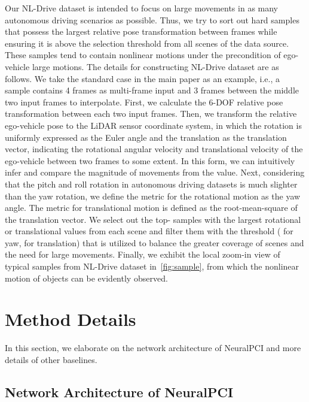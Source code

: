 \documentclass[10pt,twocolumn,letterpaper]{article}
\begin{document}
Our NL-Drive dataset is intended to focus on large movements in as many autonomous driving scenarios as possible. Thus, we try to sort out hard samples that possess the largest relative pose transformation between frames while ensuring it is above the selection threshold from all scenes of the data source. These samples tend to contain nonlinear motions under the precondition of ego-vehicle large motions. The details for constructing NL-Drive dataset are as follows. We take the standard case in the main paper as an example, i.e., a sample contains 4 frames as multi-frame input and 3 frames between the middle two input frames to interpolate. First, we calculate the 6-DOF relative pose transformation between each two input frames. Then, we transform the relative ego-vehicle pose to the LiDAR sensor coordinate system, in which the rotation is uniformly expressed as the Euler angle and the translation as the translation vector, indicating the rotational angular velocity and translational velocity of the ego-vehicle between two frames to some extent. In this form, we can intuitively infer and compare the magnitude of movements from the value. Next, considering that the pitch and roll rotation in autonomous driving datasets is much slighter than the yaw rotation, we define the metric for the rotational motion as the yaw angle. The metric for translational motion is defined as the root-mean-square of the translation vector. We select out the top- samples with the largest rotational or translational values from each scene and filter them with the threshold ( for yaw,  for translation) that is utilized to balance the greater coverage of scenes and the need for large movements. Finally, we exhibit the local zoom-in view of typical samples from NL-Drive dataset in~\cref{fig:sample}, from which the nonlinear motion of objects can be evidently observed.





\section{Method Details}
\label{sec:appendix method details}

In this section, we elaborate on the network architecture of NeuralPCI and more details of other baselines. 

\subsection{Network Architecture of NeuralPCI}
\end{document}
